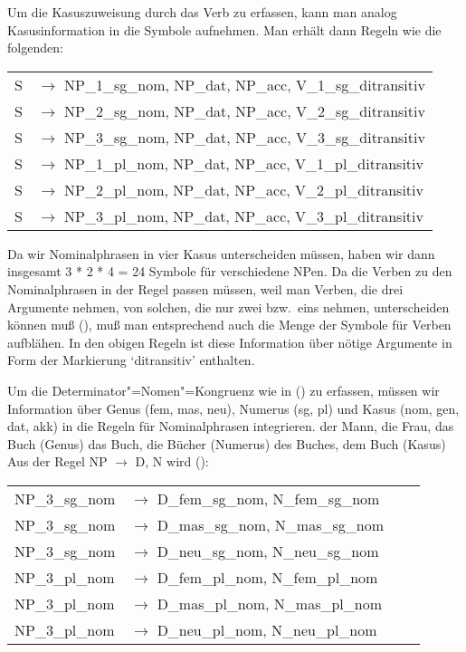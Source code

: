 Um die Kasuszuweisung durch das Verb zu erfassen, kann man analog Kasusinformation in die
Symbole aufnehmen. Man erhält dann Regeln wie die folgenden:
\ea
\label{ditrans-ps-regeln}
\begin{tabular}[t]{@{}l@{ }l}
S  & $\to$ NP\_1\_sg\_nom, NP\_dat, NP\_acc, V\_1\_sg\_ditransitiv\\
S  & $\to$ NP\_2\_sg\_nom, NP\_dat, NP\_acc, V\_2\_sg\_ditransitiv\\
S  & $\to$ NP\_3\_sg\_nom, NP\_dat, NP\_acc, V\_3\_sg\_ditransitiv\\
S  & $\to$ NP\_1\_pl\_nom, NP\_dat, NP\_acc, V\_1\_pl\_ditransitiv\\
S  & $\to$ NP\_2\_pl\_nom, NP\_dat, NP\_acc, V\_2\_pl\_ditransitiv\\
S  & $\to$ NP\_3\_pl\_nom, NP\_dat, NP\_acc, V\_3\_pl\_ditransitiv\\
\end{tabular}
\z
Da wir Nominalphrasen in vier Kasus unterscheiden müssen, haben wir dann
insgesamt 3 * 2 * 4 = 24 Symbole für verschiedene NPen. Da die Verben zu den Nominalphrasen
in der Regel passen müssen, weil man \zb Verben, die drei Argumente nehmen, von solchen,
die nur zwei bzw.\ eins nehmen, unterscheiden können muß (), muß man entsprechend auch
die Menge der Symbole für Verben aufblähen.
\eal
{}
\zl
In den obigen Regeln ist diese Information über nötige Argumente in Form der
Markierung `ditransitiv' enthalten.

Um die Determinator"=Nomen"=Kongruenz wie in () zu erfassen, müssen wir Information 
über Genus (fem, mas, neu), Numerus (sg, pl) und Kasus (nom, gen, dat, akk)
in die Regeln für Nominalphrasen integrieren.
\eal
\ex der Mann, die Frau, das Buch (Genus)
\ex das Buch, die Bücher (Numerus)
\ex des Buches, dem Buch (Kasus)
\zl
Aus der Regel NP $\to$ D, N wird ():
\ea
\begin{tabular}[t]{@{}l@{ }l@{\hspace{4mm}}l@{ }l}
NP\_3\_sg\_nom  & $\to$ D\_fem\_sg\_nom, N\_fem\_sg\_nom \\
NP\_3\_sg\_nom  & $\to$ D\_mas\_sg\_nom, N\_mas\_sg\_nom \\
NP\_3\_sg\_nom  & $\to$ D\_neu\_sg\_nom, N\_neu\_sg\_nom \\
NP\_3\_pl\_nom  & $\to$ D\_fem\_pl\_nom, N\_fem\_pl\_nom \\
NP\_3\_pl\_nom  & $\to$ D\_mas\_pl\_nom, N\_mas\_pl\_nom \\
NP\_3\_pl\_nom  & $\to$ D\_neu\_pl\_nom, N\_neu\_pl\_nom \\[2mm]
\end{tabular}

